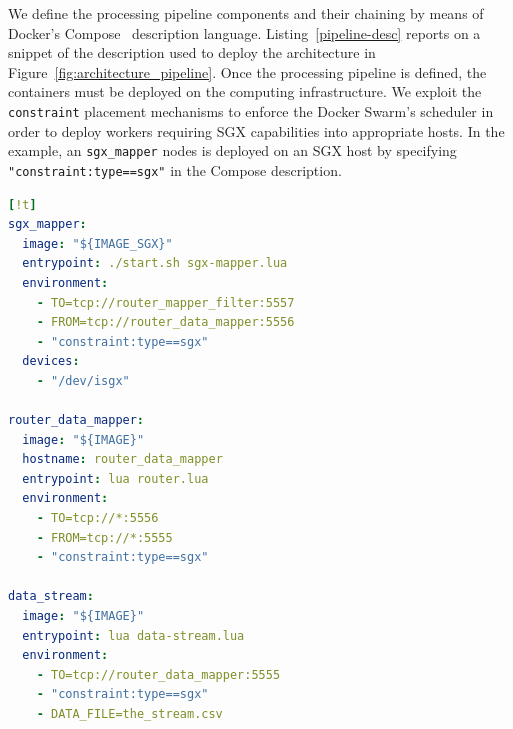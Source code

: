 We define the processing pipeline components and their chaining by means of Docker's Compose~\cite{docker:compose} description language.
Listing~\ref{pipeline-desc} reports on a snippet of the description used to deploy the architecture in Figure~\ref{fig:architecture_pipeline}.
Once the processing pipeline is defined, the containers must be deployed on the computing infrastructure.
We exploit the \texttt{constraint} placement mechanisms to enforce the Docker Swarm's scheduler in order to deploy workers requiring SGX capabilities into appropriate hosts.
In the example, an \texttt{sgx\_mapper} nodes is deployed on an SGX host by specifying \texttt{"constraint:type==sgx"} in the Compose description.
\vspace{5pt}
\begin{lstlisting}[language=YAML,caption={\SYS pipeline examples. Some attributes (\texttt{volume}, \texttt{networks}, \texttt{env\_file}) are omitted.},label=pipeline-desc][!t]
sgx_mapper:
  image: "${IMAGE_SGX}"
  entrypoint: ./start.sh sgx-mapper.lua
  environment:
    - TO=tcp://router_mapper_filter:5557
    - FROM=tcp://router_data_mapper:5556
    - "constraint:type==sgx"
  devices:
    - "/dev/isgx"

router_data_mapper:
  image: "${IMAGE}"
  hostname: router_data_mapper
  entrypoint: lua router.lua
  environment:
    - TO=tcp://*:5556
    - FROM=tcp://*:5555
    - "constraint:type==sgx"

data_stream:
  image: "${IMAGE}"
  entrypoint: lua data-stream.lua
  environment:
    - TO=tcp://router_data_mapper:5555
    - "constraint:type==sgx"
    - DATA_FILE=the_stream.csv
\end{lstlisting}
